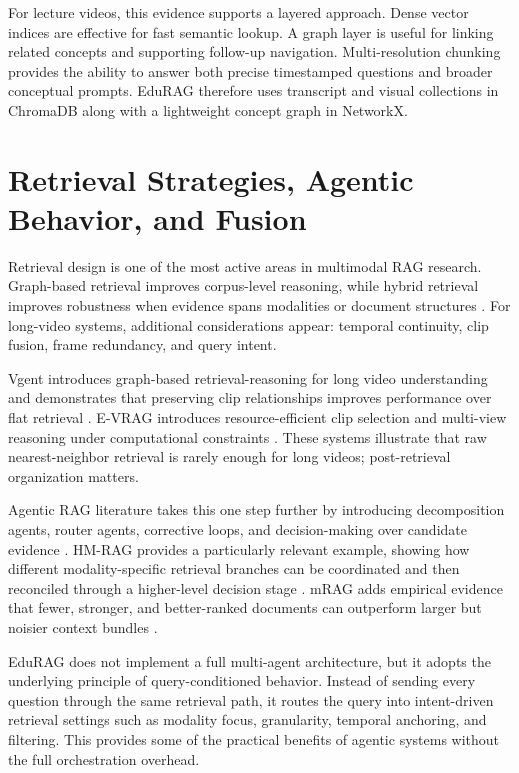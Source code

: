 \documentclass[12pt,a4paper,oneside]{report}
\begin{document}
For lecture videos, this evidence supports a layered approach. Dense vector indices are effective for fast semantic lookup. A graph layer is useful for linking related concepts and supporting follow-up navigation. Multi-resolution chunking provides the ability to answer both precise timestamped questions and broader conceptual prompts. EduRAG therefore uses transcript and visual collections in ChromaDB along with a lightweight concept graph in NetworkX.

\section{Retrieval Strategies, Agentic Behavior, and Fusion}
Retrieval design is one of the most active areas in multimodal RAG research. Graph-based retrieval improves corpus-level reasoning, while hybrid retrieval improves robustness when evidence spans modalities or document structures \cite{edge2024local,rashmi2024multimodal}. For long-video systems, additional considerations appear: temporal continuity, clip fusion, frame redundancy, and query intent.

Vgent introduces graph-based retrieval-reasoning for long video understanding and demonstrates that preserving clip relationships improves performance over flat retrieval \cite{shen2024vgent}. E-VRAG introduces resource-efficient clip selection and multi-view reasoning under computational constraints \cite{xu2024evrag}. These systems illustrate that raw nearest-neighbor retrieval is rarely enough for long videos; post-retrieval organization matters.

Agentic RAG literature takes this one step further by introducing decomposition agents, router agents, corrective loops, and decision-making over candidate evidence \cite{singh2024agentic}. HM-RAG provides a particularly relevant example, showing how different modality-specific retrieval branches can be coordinated and then reconciled through a higher-level decision stage \cite{liu2024hmrag}. mRAG adds empirical evidence that fewer, stronger, and better-ranked documents can outperform larger but noisier context bundles \cite{hu2024mrag}.

EduRAG does not implement a full multi-agent architecture, but it adopts the underlying principle of query-conditioned behavior. Instead of sending every question through the same retrieval path, it routes the query into intent-driven retrieval settings such as modality focus, granularity, temporal anchoring, and filtering. This provides some of the practical benefits of agentic systems without the full orchestration overhead.
\end{document}
